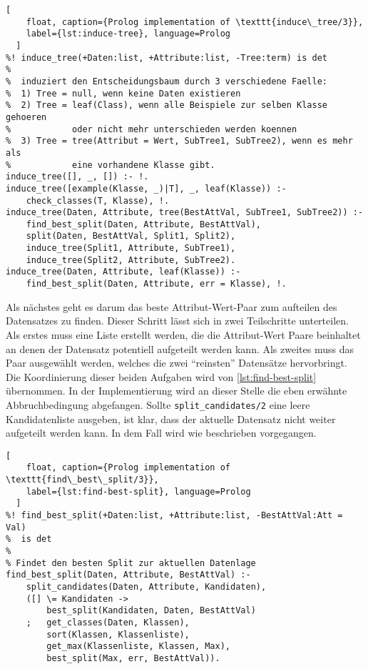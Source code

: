\begin{lstlisting}[
    float, caption={Prolog implementation of \texttt{induce\_tree/3}},
    label={lst:induce-tree}, language=Prolog
  ]
%! induce_tree(+Daten:list, +Attribute:list, -Tree:term) is det
%
%  induziert den Entscheidungsbaum durch 3 verschiedene Faelle:
%  1) Tree = null, wenn keine Daten existieren
%  2) Tree = leaf(Class), wenn alle Beispiele zur selben Klasse gehoeren
%            oder nicht mehr unterschieden werden koennen
%  3) Tree = tree(Attribut = Wert, SubTree1, SubTree2), wenn es mehr als
%            eine vorhandene Klasse gibt.
induce_tree([], _, []) :- !.
induce_tree([example(Klasse, _)|T], _, leaf(Klasse)) :-
    check_classes(T, Klasse), !.
induce_tree(Daten, Attribute, tree(BestAttVal, SubTree1, SubTree2)) :-
    find_best_split(Daten, Attribute, BestAttVal),
    split(Daten, BestAttVal, Split1, Split2),
    induce_tree(Split1, Attribute, SubTree1),
    induce_tree(Split2, Attribute, SubTree2).
induce_tree(Daten, Attribute, leaf(Klasse)) :-
    find_best_split(Daten, Attribute, err = Klasse), !.
\end{lstlisting}

Als nächstes geht es darum das beste Attribut-Wert-Paar zum aufteilen des Datensatzes zu finden.
Dieser Schritt lässt sich in zwei Teilschritte unterteilen. Als erstes muss eine Liste erstellt werden,
die die Attribut-Wert Paare beinhaltet an denen der Datensatz potentiell aufgeteilt werden kann.
Als zweites muss das Paar ausgewählt werden, welches die zwei \enquote{reinsten} Datensätze hervorbringt.
Die Koordinierung dieser beiden Aufgaben wird von \cref{lst:find-best-split} übernommen.
In der Implementierung wird an dieser Stelle die eben erwähnte Abbruchbedingung abgefangen.
Sollte \texttt{split\_candidates/2} eine leere Kandidatenliste ausgeben, ist klar, dass der aktuelle
Datensatz nicht weiter aufgeteilt werden kann. In dem Fall wird wie beschrieben vorgegangen.
\begin{lstlisting}[
    float, caption={Prolog implementation of \texttt{find\_best\_split/3}},
    label={lst:find-best-split}, language=Prolog
  ]
%! find_best_split(+Daten:list, +Attribute:list, -BestAttVal:Att = Val)
%  is det
%
% Findet den besten Split zur aktuellen Datenlage
find_best_split(Daten, Attribute, BestAttVal) :-
    split_candidates(Daten, Attribute, Kandidaten),
    ([] \= Kandidaten ->
        best_split(Kandidaten, Daten, BestAttVal)
    ;   get_classes(Daten, Klassen),
        sort(Klassen, Klassenliste),
        get_max(Klassenliste, Klassen, Max),
        best_split(Max, err, BestAttVal)).
\end{lstlisting}

